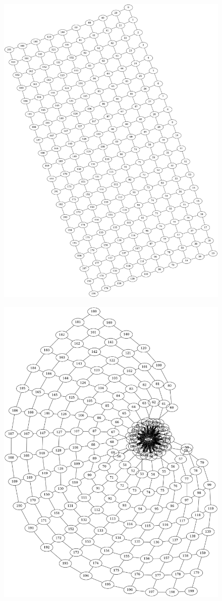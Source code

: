 \begin{figure}
\centering
\begin{minipage}{.5\textwidth}
  \centering
  \includegraphics[width=.8\linewidth]{004_team_1_agent_design/images/sc_network_grid.png}
  \label{fig:sc_network_grid}
\end{minipage}%
\begin{minipage}{.5\textwidth}
  \centering
  \includegraphics[width=.8\linewidth]{004_team_1_agent_design/images/sc_network_clique.png}

\end{minipage}
\end{figure}
